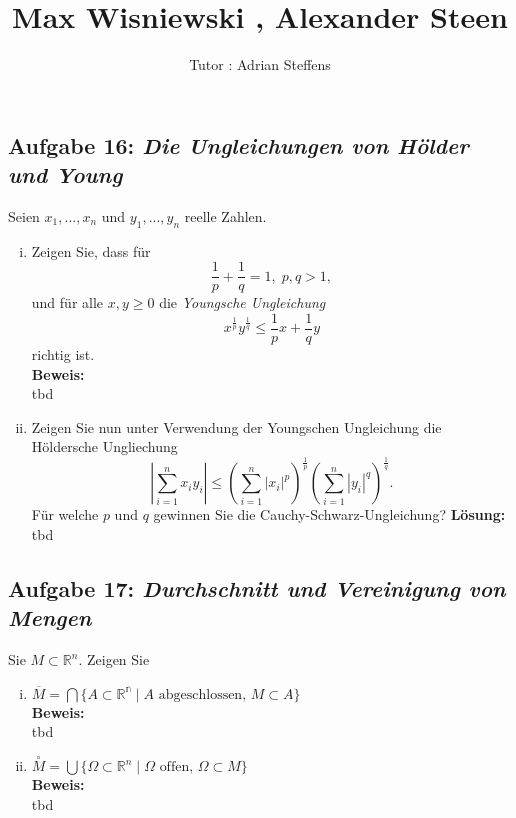 \documentclass[11pt,a4paper,ngerman]{article}
\date{}
\title{Max Wisniewski , Alexander Steen}
\author{Tutor : Adrian Steffens}
\begin{document}

\maketitle
\thispagestyle{fancy}

\subsection*{Aufgabe 16: \mdseries\itshape Die Ungleichungen von Hölder und Young}
Seien $x_1,...,x_n$ und $y_1,...,y_n$ reelle Zahlen.

\begin{enumerate}[(i)]
	\item Zeigen Sie, dass für
		$$
			\frac{1}{p} + \frac{1}{q} = 1, \; p,q>1,
		$$
		und für alle $x,y\geq 0$ die \emph{Youngsche Ungleichung}
		$$
			x^{\frac{1}{p}} y^{\frac{1}{q}} \leq \frac{1}{p} x + \frac{1}{q} y
		$$
		richtig ist.\\
	\textbf{Beweis:}\\
		tbd

	\item Zeigen Sie nun unter Verwendung der Youngschen Ungleichung die Höldersche Ungliechung
		$$
			\left| \overset{n}{\underset{i=1}{\sum}} x_i y_i \right| \leq \left( \overset{n}{\underset{i=1}{\sum}} |x_i|^p \right)^{\frac{1}{p}}
				\left( \overset{n}{\underset{i=1}{\sum}} | y_i |^q \right) ^{\frac{1}{q}}.
		$$
		Für welche $p$ und $q$ gewinnen Sie die Cauchy-Schwarz-Ungleichung?
	\textbf{Lösung:}\\
		tbd
\end{enumerate}

\subsection*{Aufgabe 17: \mdseries\itshape Durchschnitt und Vereinigung von Mengen}
	Sie $M \subset \mathbb{R}^n$. Zeigen Sie
	\begin{enumerate}[(i)]
		\item $\overline{M} = \bigcap \{ A \subset \mathbb{R^n} \; | \; A \text{ abgeschlossen, } M \subset A \}$\\
		\textbf{Beweis:}\\
			tbd

		\item $\overset{\circ}{M} = \bigcup \{ \Omega \subset \mathbb{R}^n \; | \; \Omega \text{ offen, } \Omega \subset M \}$\\
		\textbf{Beweis:}\\
			tbd
	\end{enumerate}
\end{document}
